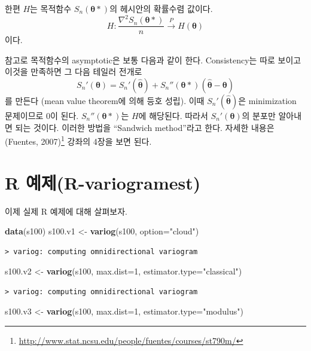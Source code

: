 \documentclass[b5paper,]{book}
\makeatletter
\newenvironment{Shaded}{\begin{snugshade}}{\end{snugshade}}
\newcommand{\KeywordTok}[1]{\textcolor[rgb]{0.13,0.29,0.53}{\textbf{{#1}}}}
\newcommand{\DataTypeTok}[1]{\textcolor[rgb]{0.13,0.29,0.53}{{#1}}}
\newcommand{\DecValTok}[1]{\textcolor[rgb]{0.00,0.00,0.81}{{#1}}}
\newcommand{\StringTok}[1]{\textcolor[rgb]{0.31,0.60,0.02}{{#1}}}
\newcommand{\NormalTok}[1]{{#1}}
\let\rmarkdownfootnote\footnote%
\def\footnote{\protect\rmarkdownfootnote}
\renewcommand{\href}[2]{#2\footnote{\url{#1}}}
\newenvironment{kframe}{%
\medskip{}
\setlength{\fboxsep}{.8em}
 \def\at@end@of@kframe{}%
 \ifinner\ifhmode%
  \def\at@end@of@kframe{\end{minipage}}%
  \begin{minipage}{\columnwidth}%
 \fi\fi%
 \def\FrameCommand##1{\hskip\@totalleftmargin \hskip-\fboxsep
 \colorbox{shadecolor}{##1}\hskip-\fboxsep
     \hskip-\linewidth \hskip-\@totalleftmargin \hskip\columnwidth}%
 \MakeFramed {\advance\hsize-\width
   \@totalleftmargin\z@ \linewidth\hsize
   \@setminipage}}%
 {\par\unskip\endMakeFramed%
 \at@end@of@kframe}
\renewenvironment{Shaded}{\begin{kframe}}{\end{kframe}}
\theoremstyle{definition}
\theoremstyle{definition}
\theoremstyle{definition}
\theoremstyle{remark}
\makeatother
\begin{document}
한편 \(H\)는 목적함수 \(S_{n}(\boldsymbol{\theta}*)\)의 헤시안의
확률수렴 값이다.
\[H:\frac{\nabla^{2}S_{n}(\boldsymbol{\theta}*)}{n} \stackrel{P}{\rightarrow} H(\boldsymbol{\theta})\]
이다.

참고로 목적함수의 asymptotic은 보통 다음과 같이 한다. Consistency는 따로
보이고 이것을 만족하면 그 다음 테일러 전개로
\[S_{n}'(\boldsymbol{\theta})=S_{n}'(\hat{\boldsymbol{\theta}})+S_{n}''(\boldsymbol{\theta}*)(\hat{\boldsymbol{\theta}}-\boldsymbol{\theta})\]
를 만든다 (mean value theorem에 의해 등호 성립). 이때
\(S_{n}'(\hat{\boldsymbol{\theta}})\)은 minimization 문제이므로 0이
된다. \(S_{n}''(\boldsymbol{\theta}*)\)는 \(H\)에 해당된다. 따라서
\(S_{n}'(\boldsymbol{\theta})\)의 분포만 알아내면 되는 것이다. 이러한
방법을 ``Sandwich method''라고 한다. 자세한 내용은
\href{http://www.stat.ncsu.edu/people/fuentes/courses/st790m/}{(Fuentes,
2007)} 강좌의 4장을 보면 된다.

\section{R 예제(R-variogramest)}\label{r-r-variogramest}

이제 실제 R 예제에 대해 살펴보자.

\begin{Shaded}
\begin{Highlighting}[]
\KeywordTok{data}\NormalTok{(s100)}
\NormalTok{s100.v1 <-}\StringTok{ }\KeywordTok{variog}\NormalTok{(s100, }\DataTypeTok{option=}\StringTok{"cloud"}\NormalTok{)}
\end{Highlighting}
\end{Shaded}

\begin{verbatim}
> variog: computing omnidirectional variogram
\end{verbatim}

\begin{Shaded}
\begin{Highlighting}[]
\NormalTok{s100.v2 <-}\StringTok{ }\KeywordTok{variog}\NormalTok{(s100, }\DataTypeTok{max.dist=}\DecValTok{1}\NormalTok{, }\DataTypeTok{estimator.type=}\StringTok{"classical"}\NormalTok{)}
\end{Highlighting}
\end{Shaded}

\begin{verbatim}
> variog: computing omnidirectional variogram
\end{verbatim}

\begin{Shaded}
\begin{Highlighting}[]
\NormalTok{s100.v3 <-}\StringTok{ }\KeywordTok{variog}\NormalTok{(s100, }\DataTypeTok{max.dist=}\DecValTok{1}\NormalTok{, }\DataTypeTok{estimator.type=}\StringTok{"modulus"}\NormalTok{)}
\end{Highlighting}
\end{Shaded}
\end{document}
